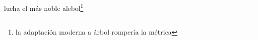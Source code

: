 lucha el más noble alebol\footnote{\textsuperscript{}la adaptación moderna a árbol rompería la métrica}
